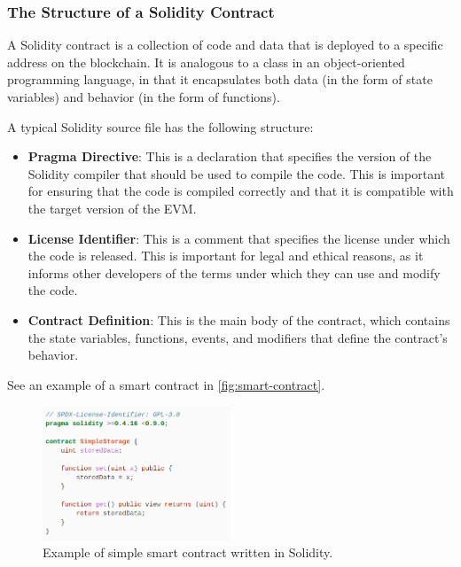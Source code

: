 \subsubsection{The Structure of a Solidity
	Contract}\label{the-structure-of-a-solidity-contract}

A Solidity contract is a collection of code and data that is deployed to
a specific address on the blockchain. It is analogous to a class in an
object-oriented programming language, in that it encapsulates both data
(in the form of state variables) and behavior (in the form of
functions).

A typical Solidity source file has the following structure:

\begin{itemize}
	\tightlist
	\item
	\textbf{Pragma Directive}: This is a declaration that specifies the
	version of the Solidity compiler that should be used to compile the
	code. This is important for ensuring that the code is compiled
	correctly and that it is compatible with the target version of the
	EVM.
	\item
	\textbf{License Identifier}: This is a comment that specifies the
	license under which the code is released. This is important for legal
	and ethical reasons, as it informs other developers of the terms under
	which they can use and modify the code.
	\item
	\textbf{Contract Definition}: This is the main body of the contract,
	which contains the state variables, functions, events, and modifiers
	that define the contract's behavior.
\end{itemize}
See an example of a smart contract in \autoref{fig:smart-contract}.


\begin{figure}[t]
	\begin{center}
		\includegraphics[width=0.5\textwidth]{./figs/smart-contract-example.png}
		\caption{Example of simple smart contract written in Solidity.}		
		\label{fig:smart-contract}
	\end{center}	
\end{figure}


